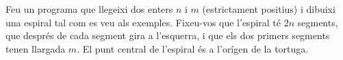 

\Statement

Feu un programa que llegeixi dos enters $n$ i $m$ (estrictament positius) i dibuixi una espiral tal com es veu als exemples. Fixeu-vos que l'espiral té $2n$ segments, que després de cada segment gira a l'esquerra, i que els dos primers segments tenen llargada $m$. El punt central de l'espiral és a l'orígen de la tortuga.

\Sample


